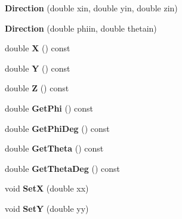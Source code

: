 \begin{DoxyCompactItemize}
\item 
\hypertarget{classDirection_a6ab97d45f5cba3aa5e571f0c0e8dd5be}{
{\bfseries Direction} (double xin, double yin, double zin)}
\label{classDirection_a6ab97d45f5cba3aa5e571f0c0e8dd5be}

\item 
\hypertarget{classDirection_ae577ffea4af24ebc490093c55adbbdba}{
{\bfseries Direction} (double phiin, double thetain)}
\label{classDirection_ae577ffea4af24ebc490093c55adbbdba}

\item 
\hypertarget{classDirection_a16e35cd86702666a7f2a9de1962b99d3}{
double {\bfseries X} () const }
\label{classDirection_a16e35cd86702666a7f2a9de1962b99d3}

\item 
\hypertarget{classDirection_a87038a7a2381c3bfa062d1016ece1b0a}{
double {\bfseries Y} () const }
\label{classDirection_a87038a7a2381c3bfa062d1016ece1b0a}

\item 
\hypertarget{classDirection_a7e8275fe3078f9fb2c4f17cafd219dca}{
double {\bfseries Z} () const }
\label{classDirection_a7e8275fe3078f9fb2c4f17cafd219dca}

\item 
\hypertarget{classDirection_ae60296b4e458a378de7fac5e194d128a}{
double {\bfseries GetPhi} () const }
\label{classDirection_ae60296b4e458a378de7fac5e194d128a}

\item 
\hypertarget{classDirection_ab10dd98d45f913882643a8ec3a0063a1}{
double {\bfseries GetPhiDeg} () const }
\label{classDirection_ab10dd98d45f913882643a8ec3a0063a1}

\item 
\hypertarget{classDirection_aedb9b4a05e136edbb8d9ff19b84a5698}{
double {\bfseries GetTheta} () const }
\label{classDirection_aedb9b4a05e136edbb8d9ff19b84a5698}

\item 
\hypertarget{classDirection_a3ed1c31e69e15d4b6a50aeb5bbf48049}{
double {\bfseries GetThetaDeg} () const }
\label{classDirection_a3ed1c31e69e15d4b6a50aeb5bbf48049}

\item 
\hypertarget{classDirection_a384688a73b4fea94e29f76401c329588}{
void {\bfseries SetX} (double xx)}
\label{classDirection_a384688a73b4fea94e29f76401c329588}

\item 
\hypertarget{classDirection_a879833b6fdb717fa5eee797e9fa37110}{
void {\bfseries SetY} (double yy)}
\label{classDirection_a879833b6fdb717fa5eee797e9fa37110}


\end{DoxyCompactItemize}
